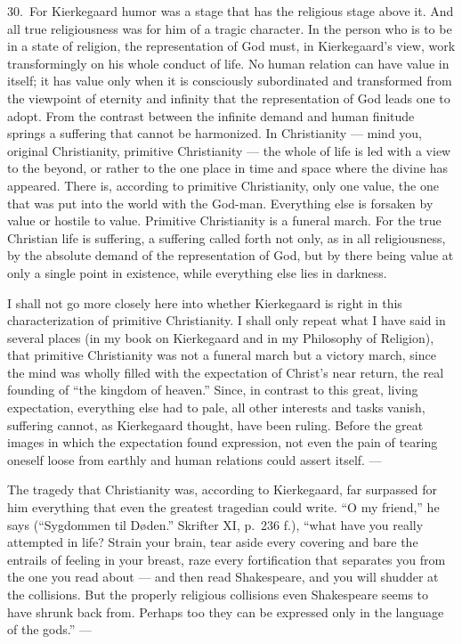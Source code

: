 \documentclass[12pt]{book}
\newcommand{\opage}[1]{\marginnote{\footnotesize\textit{[#1]}}}
\begin{document}
30.~For Kierkegaard humor was a stage that has the religious stage above it. And all true
religiousness was for him of a tragic character. In the person who is to be in a state of
religion, the representation of God must, in Kierkegaard's view, work transformingly on
his whole conduct of life. No human relation can have value in itself; it has value only
when it is consciously subordinated and transformed from the viewpoint of eternity and
infinity that the representation of God leads one to adopt. From the \opage{105}contrast
between the infinite demand and human finitude springs a suffering that cannot be
harmonized. In Christianity --- mind you, original Christianity, primitive Christianity
--- the whole of life is led with a view to the beyond, or rather to the one place in
time and space where the divine has appeared. There is, according to primitive
Christianity, only one value, the one that was put into the world with the God-man.
Everything else is forsaken by value or hostile to value. Primitive Christianity is a
funeral march. For the true Christian life is suffering, a suffering called forth not
only, as in all religiousness, by the absolute demand of the representation of God, but
by there being value at only a single point in existence, while everything else lies in
darkness.

I shall not go more closely here into whether Kierkegaard is right in this
characterization of primitive Christianity. I shall only repeat what I have said in
several places (in my book on Kierkegaard and in my Philosophy of Religion), that
primitive Christianity was not a funeral march but a victory march, since the mind was
wholly filled with the expectation of Christ's near return, the real founding of ``the
kingdom of heaven.'' Since, in contrast to this great, living expectation, everything else
had to pale, all other interests and tasks vanish, suffering cannot, as Kierkegaard
thought, have been ruling. Before the great images in which the expectation found
expression, not even the pain of tearing oneself loose from earthly and human relations
could assert itself. ---

The tragedy that Christianity was, according to Kierkegaard, far surpassed for him
everything that even the greatest tragedian could write. ``O my friend,'' he says (``Sygdommen
til Døden.'' Skrifter XI, p.~236 f.), ``what have you really attempted in life?
Strain your brain, tear aside every covering and bare the entrails of feeling in your
breast, raze every fortification that separates you from the one you read about --- and
then read Shakespeare, and you will shudder at the collisions. But the properly religious
collisions even Shakespeare seems to have shrunk back from. Perhaps too they can be
expressed only in the language of the gods.'' ---
\end{document}
